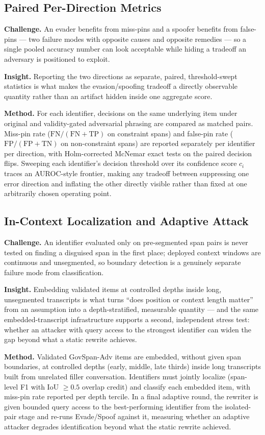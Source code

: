 \documentclass[11pt]{article}
\begin{document}
\subsection{Paired Per-Direction Metrics}
\textbf{Challenge.} An evader benefits from miss-pins and a spoofer benefits from false-pins --- two failure modes with opposite causes and opposite remedies --- so a single pooled accuracy number can look acceptable while hiding a tradeoff an adversary is positioned to exploit.

\textbf{Insight.} Reporting the two directions as separate, paired, threshold-swept statistics is what makes the evasion/spoofing tradeoff a directly observable quantity rather than an artifact hidden inside one aggregate score.

\textbf{Method.} For each identifier, decisions on the same underlying item under original and validity-gated adversarial phrasing are compared as matched pairs. Miss-pin rate ($\text{FN}/(\text{FN}+\text{TP})$ on constraint spans) and false-pin rate ($\text{FP}/(\text{FP}+\text{TN})$ on non-constraint spans) are reported separately per identifier per direction, with Holm-corrected McNemar exact tests on the paired decision flips. Sweeping each identifier's decision threshold over its confidence score $c_i$ traces an AUROC-style frontier, making any tradeoff between suppressing one error direction and inflating the other directly visible rather than fixed at one arbitrarily chosen operating point.

\subsection{In-Context Localization and Adaptive Attack}
\textbf{Challenge.} An identifier evaluated only on pre-segmented span pairs is never tested on finding a disguised span in the first place; deployed context windows are continuous and unsegmented, so boundary detection is a genuinely separate failure mode from classification.

\textbf{Insight.} Embedding validated items at controlled depths inside long, unsegmented transcripts is what turns ``does position or context length matter'' from an assumption into a depth-stratified, measurable quantity --- and the same embedded-transcript infrastructure supports a second, independent stress test: whether an attacker with query access to the strongest identifier can widen the gap beyond what a static rewrite achieves.

\textbf{Method.} Validated GovSpan-Adv items are embedded, without given span boundaries, at controlled depths (early, middle, late thirds) inside long transcripts built from unrelated filler conversation. Identifiers must jointly localize (span-level F1 with IoU $\geq 0.5$ overlap credit) and classify each embedded item, with miss-pin rate reported per depth tercile. In a final adaptive round, the rewriter is given bounded query access to the best-performing identifier from the isolated-pair stage and re-runs Evade/Spoof against it, measuring whether an adaptive attacker degrades identification beyond what the static rewrite achieved.
\end{document}
